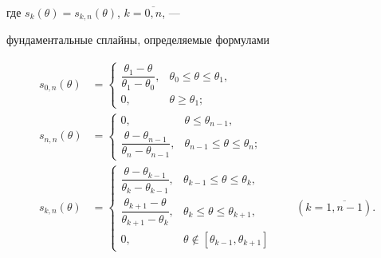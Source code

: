 где $s_k( \theta) = s_{k,n}( \theta)$, $k= \overline{0,n}$, ---


фундаментальные сплайны, определяемые формулами


\begin{align*}


s_{0,n}(\theta) &=


\begin{cases}


\dfrac{ \theta_1 - \theta}{ \theta_1 - \theta_0},


& \theta_0 \leq \theta \leq \theta_1, \\


0,   & \theta \geq \theta_1;


\end{cases}


\\


s_{n,n}(\theta) &=


\begin{cases}


0,  & \theta \leq \theta_{n-1}, \\


\dfrac{ \theta - \theta_{n-1}}{ \theta_n - \theta_{n-1}},


& \theta_{n-1} \leq \theta \leq \theta_n; 


\end{cases}


\\


s_{k,n}(\theta) &=


\begin{cases}


\dfrac{ \theta - \theta_{k-1}}{ \theta_k - \theta_{k-1}},


& \theta_{k-1} \leq \theta \leq \theta_k,     \\


\dfrac{ \theta_{k+1} - \theta}{ \theta_{k+1} - \theta_k},


& \theta_k \leq \theta \leq \theta_{k+1}, \\


0,   & \theta \notin [\theta_{k-1}, \theta_{k+1}]


\end{cases}


\qquad (k= \overline{1,n-1}).


\end{align*}






